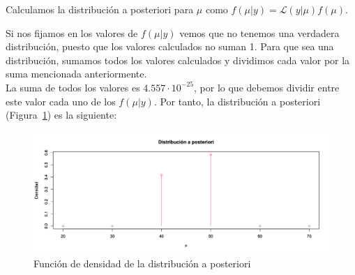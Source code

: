 \documentclass[12pt,a4paper,twoside,openright,titlepage,final]{article}
\begin{document}
Calculamos la distribución a posteriori para $\mu$ como $f(\mu | y) = \mathcal{L}(y|\mu)f(\mu)$.\\

\begin{table}[htbp!]
\centering
{}
\end{table}

Si nos fijamos en los valores de $f(\mu | y)$ vemos que no tenemos una verdadera distribución, puesto que los valores calculados no suman 1. Para que sea una distribución, sumamos todos los valores calculados y dividimos cada valor por la suma mencionada anteriormente.\\

La suma de todos los valores es $4.557 \cdot 10^{-25}$, por lo que debemos dividir entre este valor cada uno de los $f(\mu | y)$. Por tanto, la distribución a posteriori (Figura~\ref{fig:distribucion_posteriori_normal}) es la siguiente:

\begin{table}[htbp!]
\centering
{}
\end{table}

\begin{figure}[tbph!]
\centering
\includegraphics[width=0.9\linewidth]{./imagenes/distribucion_posteriori_normal}
\caption{Función de densidad de la distribución a posteriori}
\label{fig:distribucion_posteriori_normal}
\end{figure}
\end{document}

